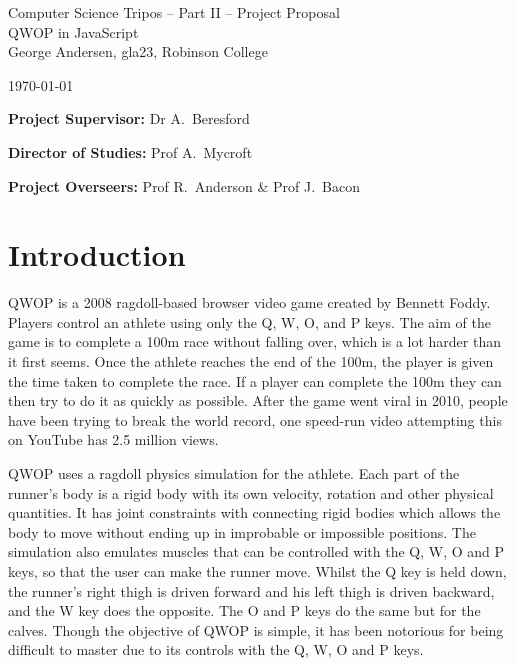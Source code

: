 \documentclass[12pt,a4paper,twoside]{article}
\begin{document}
\begin{center}
\Large
Computer Science Tripos -- Part II -- Project Proposal\\[4mm]
\LARGE
QWOP in JavaScript \\[4mm]

\large
George Andersen, gla23, Robinson College

\today

\end{center}

\vspace{5mm}

\textbf{Project Supervisor:} Dr A.~Beresford

\textbf{Director of Studies:} Prof A.~Mycroft

\textbf{Project Overseers:} Prof R.~Anderson \& Prof J.~Bacon


\section*{Introduction}

QWOP is a 2008 ragdoll-based browser video game created by Bennett Foddy. Players control an athlete using only the Q, W, O, and P keys. The aim of the game is to complete a 100m race without falling over, which is a lot harder than it first seems.
Once the athlete reaches the end of the 100m, the player is given the time taken to complete the race. If a player can complete the 100m they can then try to do it as quickly as possible. After the game went viral in 2010, people have been trying to break the world record, one speed-run video attempting this on YouTube has 2.5 million views.

QWOP uses a ragdoll physics simulation for the athlete. Each part of the runner's body is a rigid body with its own velocity, rotation and other physical quantities. It has joint constraints with connecting rigid bodies which allows the body to move without ending up in improbable or impossible positions.
The simulation also emulates muscles that can be controlled with the Q, W, O and P keys, so that the user can make the runner move. 
Whilst the Q key is held down, the runner's right thigh is driven forward and his left thigh is driven backward, and the W key does the opposite. The O and P keys do the same but for the calves.
Though the objective of QWOP is simple, it has been notorious for being difficult to master due to its controls with the Q, W, O and P keys.
\end{document}
